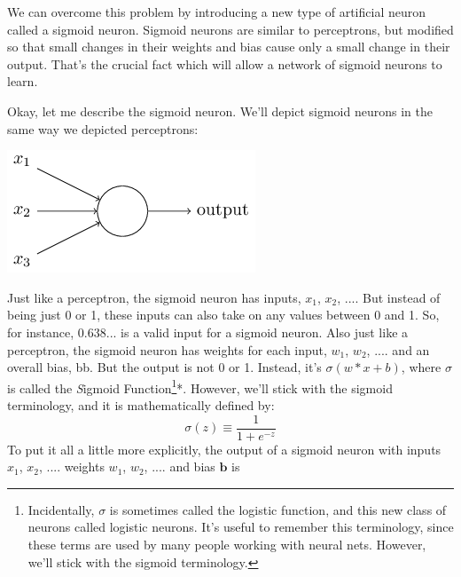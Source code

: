 \documentclass[a4paper,12pt]{report}%
\begin{document}
We can overcome this problem by introducing a new type of artificial neuron called a sigmoid neuron. Sigmoid neurons are similar to perceptrons, but modified so that small changes in their weights and bias cause only a small change in their output. That's the crucial fact which will allow a network of sigmoid neurons to learn.


Okay, let me describe the sigmoid neuron. We'll depict sigmoid neurons in the same way we depicted perceptrons:

\begin{center}
 \includegraphics[width=0.6\linewidth]{images/tikz9.png}
\end{center}


Just like a perceptron, the sigmoid neuron has inputs, $x_{1}$, $x_{2}$, .... But instead of being just 0 or 1, these inputs can also take on any values between 0 and 1. So, for instance, 0.638... is a valid input for a sigmoid neuron. Also just like a perceptron, the sigmoid neuron has weights for each input, $w_{1}$, $w_{2}$, .... and an overall bias, bb. But the output is not 0 or 1. Instead, it's $\sigma(w*x+b)$, where $\sigma$ is called the {\emph Sigmoid Function}\footnote{\color{blue}Incidentally, $\sigma$ is sometimes called the logistic function, and this new class of neurons called logistic neurons. It's useful to remember this terminology, since these terms are used by many people working with neural nets. However, we'll stick with the sigmoid terminology.}{\color{blue}*}. %
However, we'll stick with the sigmoid terminology, and it is mathematically defined by:
\begin{equation}
\sigma(z) ≡ \frac{1}{1+e^{-z}}
\end{equation}
To put it all a little more explicitly, the output of a sigmoid neuron with inputs $x_{1}$, $x_{2}$, .... weights $w_{1}$, $w_{2}$, .... and bias $\mathbf{b}$ is
\end{document}

